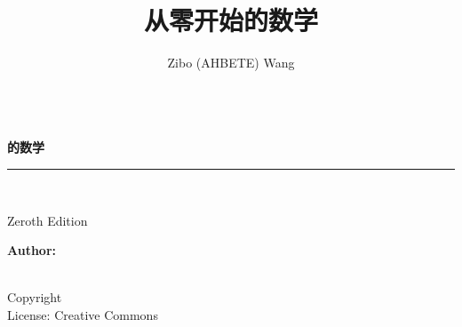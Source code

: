 \documentclass[openany]{book}
\title{从零开始的数学}
\author{Zibo (AHBETE) Wang}
\makeatletter
\newcommand{\booksubtitle}{从零开始系列}
\newcommand{\booklicense}{Creative Commons}
\newcommand{\authorsubtitle}{}
\newcommand{\bookauthor}{\@author}
\makeatother
\begin{document}
\frontmatter

\begin{titlepage}
\begin{flushleft}

\begin{center}
\textbf{\\{\LARGE\selectfont  的数学}}
\end{center}

\par\noindent\rule{\textwidth}{4pt}\\


\begin{flushright}
\large Zeroth Edition
\end{flushright}

\vspace{\fill}

\textbf{\large Author: }\textbf{\large \bookauthor}\\[3.5pt]
\textbf{\large \textit{\authorsubtitle}}\\

\vspace{\fill}

\end{flushleft}
\end{titlepage}
\restoregeometry

\thispagestyle{empty}

\begin{flushleft}
\vspace*{\fill}
\vspace{\fill}
Copyright \textcopyright{} \the\year{}  \bookauthor\\
License: \booklicense
\end{flushleft}
\end{document}
